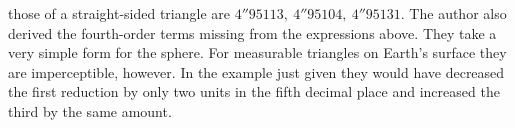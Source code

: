 %
those of a straight-sided triangle are \(4''95113,\ 4''95104,\ 4''95131\). The author also derived the fourth-order terms missing from the expressions above. They take a very simple form for the sphere. For measurable triangles on Earth's surface they are imperceptible, however. In the example just given they would have decreased the first reduction by only two units in the fifth decimal place and increased the third by the same amount.


